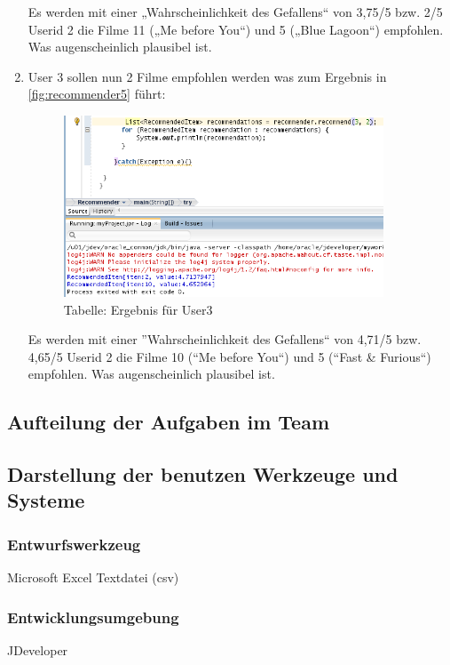 \begin{enumerate}
Es werden mit einer „Wahrscheinlichkeit des Gefallens“ von 3,75/5 bzw. 2/5 Userid 2 die Filme 11 („Me before You“) und 5 („Blue Lagoon“) empfohlen. Was augenscheinlich plausibel ist.

\item User 3 sollen nun 2 Filme empfohlen werden was zum Ergebnis in \autoref{fig:recommender5} führt:
\begin{figure}[!htb]
        \begin{minipage}{1\textwidth}
                \centering
                \includegraphics[width=0.90\textwidth]{pics/recommender5.png}\par\vspace{0cm}
                \caption{Tabelle: Ergebnis für User3}
                \label{fig:recommender5}
        \end{minipage}
\end{figure}


Es werden mit einer ''Wahrscheinlichkeit des Gefallens`` von 4,71/5 bzw. 4,65/5 Userid 2 die Filme 10 (``Me before You``) und 5 (``Fast \& Furious``) empfohlen. Was augenscheinlich plausibel ist.

\end{enumerate}

\subsection*{Aufteilung der Aufgaben im Team}
\subsection*{Darstellung der benutzen Werkzeuge und Systeme}
\subsubsection*{Entwurfswerkzeug}
Microsoft Excel
Textdatei (csv)
\subsubsection*{Entwicklungsumgebung}
JDeveloper
